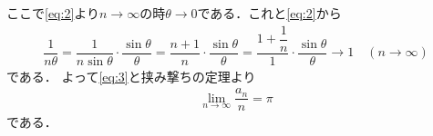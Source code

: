 \documentclass[../../main.tex]{subfiles}
\begin{document}
ここで\cref{eq:2}より$n\to\infty$の時$\theta\to 0$である．これと\cref{eq:2}から
\begin{align}
  \dfrac{1}{n\theta}=\dfrac{1}{n\sin\theta}\cdot\dfrac{\sin\theta}{\theta}=\dfrac{n+1}{n}\cdot\dfrac{\sin\theta}{\theta}=\dfrac{1+\dfrac{1}{n}}{1}\cdot\dfrac{\sin\theta}{\theta}\longrightarrow 1 \quad(n\to\infty)
\end{align}
である．
よって\cref{eq:3}と挟み撃ちの定理より
\begin{align}
  \lim_{n\to\infty}\dfrac{a_n}{n} = \pi
\end{align}
である．

\newpage
\end{document}
